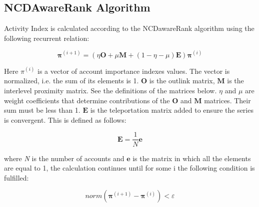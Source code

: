 \documentclass[a4paper,12pt]{article}
\begin{document}
\subsection{NCDAwareRank Algorithm}

Activity Index is calculated according to the NCDawareRank algorithm using the following recurrent relation: 


\begin{equation}
    \label{recurrent_formula_for_ncdawarerank}
    \boldsymbol{\pi}^{(i+1)} = ( \eta \boldsymbol{O} + \mu \boldsymbol{M} + ( 1 - \eta - \mu ) \boldsymbol{E} ) \boldsymbol{\pi}^{(i)}
\end{equation}

Here $\pi^{(i)}$ is a vector of account importance indexes values. The vector is normalized, i.e. the sum of its elements is 1. $\boldsymbol{O}$ is the outlink matrix, $\boldsymbol{M}$ is the interlevel proximity matrix. See the definitions of the matrices below. $\eta$ and $\mu$ are weight coefficients that determine contributions of the $\boldsymbol{O}$ and $\boldsymbol{M}$ matrices. Their sum must be less than 1. $\boldsymbol{E}$ is the teleportation matrix added to ensure the series is convergent. This is defined as follows:


$$
\boldsymbol{E}=\frac{1}{N}\boldsymbol{e}
$$

where \textit{N} is the number of accounts and $\boldsymbol{e}$ is the matrix in which all the elements are equal to 1, the calculation continues until for some i the following condition is fulfilled: 


$$
norm(\boldsymbol{\pi}^{(i+1)}-\boldsymbol{\pi}^{(i)})<\varepsilon
$$
\end{document}
